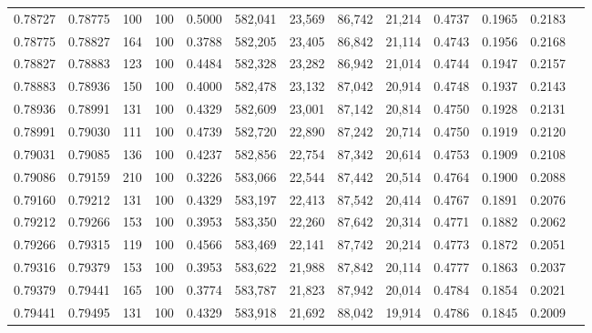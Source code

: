 \begin{tabular}{rrrrrrrrrrrrr}
0.78727 & 0.78775 &   100 & 100 &                                     0.5000 & 582,041 &  23,569 &  86,742 &  21,214 & 0.4737 & 0.1965 & 0.2183 \\
0.78775 & 0.78827 &   164 & 100 &                                     0.3788 & 582,205 &  23,405 &  86,842 &  21,114 & 0.4743 & 0.1956 & 0.2168 \\
0.78827 & 0.78883 &   123 & 100 &                                     0.4484 & 582,328 &  23,282 &  86,942 &  21,014 & 0.4744 & 0.1947 & 0.2157 \\
0.78883 & 0.78936 &   150 & 100 &                                     0.4000 & 582,478 &  23,132 &  87,042 &  20,914 & 0.4748 & 0.1937 & 0.2143 \\
0.78936 & 0.78991 &   131 & 100 &                                     0.4329 & 582,609 &  23,001 &  87,142 &  20,814 & 0.4750 & 0.1928 & 0.2131 \\
0.78991 & 0.79030 &   111 & 100 &                                     0.4739 & 582,720 &  22,890 &  87,242 &  20,714 & 0.4750 & 0.1919 & 0.2120 \\
0.79031 & 0.79085 &   136 & 100 &                                     0.4237 & 582,856 &  22,754 &  87,342 &  20,614 & 0.4753 & 0.1909 & 0.2108 \\
0.79086 & 0.79159 &   210 & 100 &                                     0.3226 & 583,066 &  22,544 &  87,442 &  20,514 & 0.4764 & 0.1900 & 0.2088 \\
0.79160 & 0.79212 &   131 & 100 &                                     0.4329 & 583,197 &  22,413 &  87,542 &  20,414 & 0.4767 & 0.1891 & 0.2076 \\
0.79212 & 0.79266 &   153 & 100 &                                     0.3953 & 583,350 &  22,260 &  87,642 &  20,314 & 0.4771 & 0.1882 & 0.2062 \\
0.79266 & 0.79315 &   119 & 100 &                                     0.4566 & 583,469 &  22,141 &  87,742 &  20,214 & 0.4773 & 0.1872 & 0.2051 \\
0.79316 & 0.79379 &   153 & 100 &                                     0.3953 & 583,622 &  21,988 &  87,842 &  20,114 & 0.4777 & 0.1863 & 0.2037 \\
0.79379 & 0.79441 &   165 & 100 &                                     0.3774 & 583,787 &  21,823 &  87,942 &  20,014 & 0.4784 & 0.1854 & 0.2021 \\
0.79441 & 0.79495 &   131 & 100 &                                     0.4329 & 583,918 &  21,692 &  88,042 &  19,914 & 0.4786 & 0.1845 & 0.2009 \\

\end{tabular}
